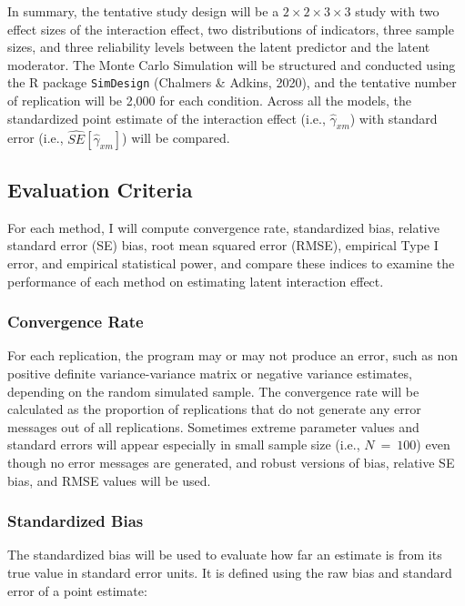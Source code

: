 \documentclass[
  11pt,
  man]{apa6}
\begin{document}
In summary, the tentative study design will be a \(2 \times 2 \times 3 \times 3\) study with two effect sizes of the interaction effect, two distributions of indicators, three sample sizes, and three reliability levels between the latent predictor and the latent moderator. The Monte Carlo Simulation will be structured and conducted using the R package \texttt{SimDesign} (Chalmers \& Adkins, 2020), and the tentative number of replication will be 2,000 for each condition. Across all the models, the standardized point estimate of the interaction effect (i.e., \(\hat{\gamma}_{xm}\)) with standard error (i.e., \(\hat{SE}[\hat{\gamma}_{xm}]\)) will be compared.

\hypertarget{evaluation-criteria}{%
\subsection{Evaluation Criteria}\label{evaluation-criteria}}

For each method, I will compute convergence rate, standardized bias, relative standard error (SE) bias, root mean squared error (RMSE), empirical Type I error, and empirical statistical power, and compare these indices to examine the performance of each method on estimating latent interaction effect.

\hypertarget{convergence-rate}{%
\subsubsection{Convergence Rate}\label{convergence-rate}}

For each replication, the program may or may not produce an error, such as non positive definite variance-variance matrix or negative variance estimates, depending on the random simulated sample. The convergence rate will be calculated as the proportion of replications that do not generate any error messages out of all replications.
Sometimes extreme parameter values and standard errors will appear especially in small sample size (i.e., \(N \ = \ 100\)) even though no error messages are generated, and robust versions of bias, relative SE bias, and RMSE values will be used.

\hypertarget{standardized-bias}{%
\subsubsection{Standardized Bias}\label{standardized-bias}}

The standardized bias will be used to evaluate how far an estimate is from its true value in standard error units. It is defined using the raw bias and standard error of a point estimate:
\end{document}

